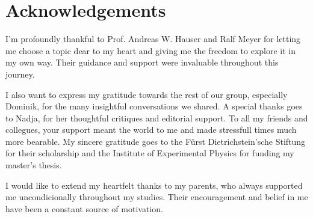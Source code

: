 \chapter*{Acknowledgements}
\label{chap:acknowledgements}

I'm profoundly thankful to Prof. Andreas W. Hauser and Ralf Meyer for letting me choose a topic dear to my heart and giving me the freedom to explore it in my own way. Their guidance and support were invaluable throughout this journey.

I also want to express my gratitude towards the rest of our group, especially Dominik, for the many insightful conversations we shared. A special thanks goes to Nadja, for her thoughtful critiques and editorial support. To all my friends and collegues, your support meant the world to me and made stressfull times much more bearable. My sincere gratitude goes to the Fürst Dietrichstein'sche Stiftung for their scholarship and the Institute of Experimental Physics for funding my master's thesis.

I would like to extend my heartfelt thanks to my parents, who always supported me uncondicionally throughout my studies. Their encouragement and belief in me have been a constant source of motivation. 